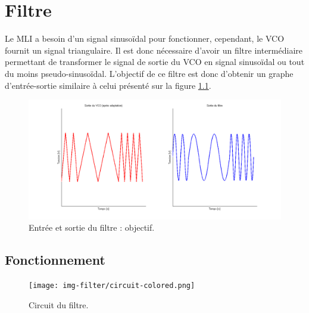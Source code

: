 \chapter{Filtre}
\label{sec:filtre}
Le MLI a besoin d'un signal sinusoïdal pour fonctionner, cependant, le VCO fournit un
signal triangulaire. Il est donc nécessaire d'avoir un filtre intermédiaire permettant
de transformer le signal de sortie du VCO en signal sinusoïdal ou tout du moins pseudo-sinusoïdal.
L'objectif de ce filtre est donc d'obtenir un graphe d'entrée-sortie similaire à
celui présenté sur la figure \ref{fig:filter-in-out}.

\begin{figure}[ht]
	\centering
	\includegraphics[scale=0.4]{img-filter/in-out.png}
	\caption{Entrée et sortie du filtre : objectif.}
	\label{fig:filter-in-out}
\end{figure}

\section{Fonctionnement}

\begin{figure}[ht]
	\centering
	\texttt{[image: img-filter/circuit-colored.png]}
	\caption{Circuit du filtre.}
	\label{fig:circuit-filtre}
\end{figure}

